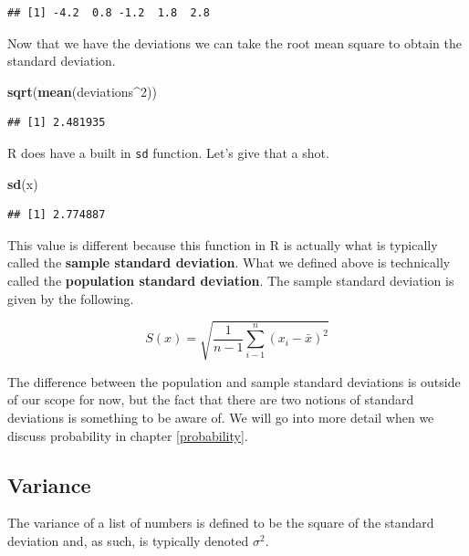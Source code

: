 \documentclass[]{book}
\newenvironment{Shaded}{\begin{snugshade}}{\end{snugshade}}
\newcommand{\DecValTok}[1]{\textcolor[rgb]{0.00,0.00,0.81}{#1}}
\newcommand{\KeywordTok}[1]{\textcolor[rgb]{0.13,0.29,0.53}{\textbf{#1}}}
\newcommand{\NormalTok}[1]{#1}
\newcommand{\OperatorTok}[1]{\textcolor[rgb]{0.81,0.36,0.00}{\textbf{#1}}}
\begin{document}
\begin{verbatim}
## [1] -4.2  0.8 -1.2  1.8  2.8
\end{verbatim}

Now that we have the deviations we can take the root mean square to obtain the standard deviation.

\begin{Shaded}
\begin{Highlighting}[]
\KeywordTok{sqrt}\NormalTok{(}\KeywordTok{mean}\NormalTok{(deviations}\OperatorTok{^}\DecValTok{2}\NormalTok{))}
\end{Highlighting}
\end{Shaded}

\begin{verbatim}
## [1] 2.481935
\end{verbatim}

R does have a built in \texttt{sd} function. Let's give that a shot.

\begin{Shaded}
\begin{Highlighting}[]
\KeywordTok{sd}\NormalTok{(x)}
\end{Highlighting}
\end{Shaded}

\begin{verbatim}
## [1] 2.774887
\end{verbatim}

This value is different because this function in R is actually what is typically called the \textbf{sample standard deviation}. What we defined above is technically called the \textbf{population standard deviation}. The sample standard deviation is given by the following.

\[S(x) = \sqrt{\frac{1}{n-1}\sum_{i-1}^n (x_i - \bar{x})^2}\]

The difference between the population and sample standard deviations is outside of our scope for now, but the fact that there are two notions of standard deviations is something to be aware of. We will go into more detail when we discuss probability in chapter \ref{probability}.

\hypertarget{variance}{%
\subsection{Variance}\label{variance}}

The variance of a list of numbers is defined to be the square of the standard deviation and, as such, is typically denoted \(\sigma^2\).
\end{document}

